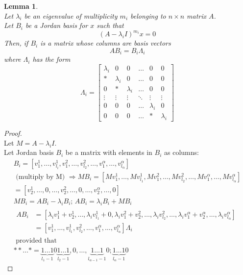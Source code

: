 \documentclass[twoside]{amsart}
\theoremstyle{plain}
\newtheorem{lemma}{Lemma}
\theoremstyle{definition}
\begin{document}
\begin{lemma}\label{L:Pre-Jordan_Canonical_Form_Lemma} \quad \\
  Let $\lambda_i$ be an eigenvalue of multiplicity $m_i$ belonging to $n \times n$ matrix $A$.  \\
  Let $B_i$ be a Jordan basis for $x$ such that
  \[
  (A-\lambda_i I)^{m_i}x = 0
  \]
  Then, if $B_i$ is a matrix whose columns are basis vectors
  \begin{equation}\label{E:Pre-Jordan_One_Principal_Vector_Space_equation}
    AB_i = B_i \Lambda_i
  \end{equation}
  where $\Lambda_i$ has the form
  \begin{equation}
    \Lambda_i = \left[ 
      \begin{matrix}
	\lambda_i & 0 & 0 & \dots & 0 & 0 \\
	* & \lambda_i & 0 & \dots & 0 & 0 \\
	0 & * & \lambda_i & \dots & 0 & 0 \\
	\vdots & \vdots & \vdots & \ddots & \vdots & \vdots \\
	0 & 0 & 0 & \dots & \lambda_i & 0 \\
	0 & 0 & 0 & \dots & * & \lambda_i
	\end{matrix}
      \right]
  \end{equation}
\end{lemma}
\begin{proof} \quad \\
  Let $M=A-\lambda_i I$.  \\
  Let Jordan basis $B_i$ be a matrix with elements in $B_i$ as columns: 
\begin{gather*}
  B_i = [v_1^1, \dots , v_{l_i}^1, v_1^2, \dots , v_{l_2}^2, \dots, v_1^{\alpha}, \dots , v_{l_{\alpha}}^{\alpha}]  \\
  \text{ (multiply by M)  } \Longrightarrow MB_i = [Mv_1^1, \dots , Mv_{l_1}^1, Mv_1^2, \dots , Mv_{l_2}^2, \dots, Mv_1^{\alpha}, \dots , Mv_{l_{\alpha}}^{\alpha}]  \\
   = [v_2^1, \dots , 0, \dots , v_2^2, \dots , 0, \dots, v_2^{\alpha}, \dots , 0]  \\
   MB_i = AB_i - \lambda_i B_i ; \, AB_i = \lambda_i B_i + MB_i \\
   \begin{aligned}
     AB_i & =  [ \lambda_i v_1^1+ v_2^1, \dots , \lambda_i v_{l_1}^1 + 0 , \lambda_i v_1^2 + v_2^2, \dots , \lambda_i v_{l_2}^2, \dots , \lambda_i v_1^{\alpha} + v_2^{\alpha}, \dots, \lambda_i v_{l_{\alpha}}^{\alpha} ] \\
     & = [v_1^1, \dots ,v_{l_1}^1,v_{l_2}^2, \dots , v_1^{\alpha}, \dots , v_{l_{\alpha}}^{\alpha} ] \Lambda_i
   \end{aligned}
   \\
   \text{ provided that }\\
   ** \dots * = \underbrace{1 \dots 1}_{l_1-1} 0 \underbrace{ 1 \dots 1 }_{l_2 - 1} , 0 , \dots , \underbrace{ 1 \dots 1 }_{l_{\alpha -1} -1} 0 ; \underbrace{ 1 \dots 1 }_{ l_{\alpha}-1 } 0 
\end{gather*}
\end{proof}
\end{document}
